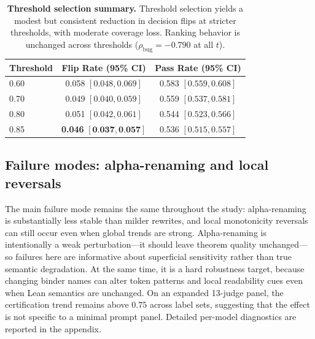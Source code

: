 \documentclass{article}
\begin{document}
\begin{table}[t]
  \centering
  \small
  \begin{tabular}{lcc}
    \toprule
    \textbf{Threshold} & \textbf{Flip Rate (95\% CI)}                        & \textbf{Pass Rate (95\% CI)} \\
    \midrule
    0.60               & 0.058 \([0.048, 0.069]\)                            & 0.583 \([0.559, 0.608]\)     \\
    0.70               & 0.049 \([0.040, 0.059]\)                            & 0.559 \([0.537, 0.581]\)     \\
    0.80               & 0.051 \([0.042, 0.061]\)                            & 0.544 \([0.523, 0.566]\)     \\
    0.85               & \textbf{0.046} \([\textbf{0.037}, \textbf{0.057}]\) & 0.536 \([0.515, 0.557]\)     \\
    \bottomrule
  \end{tabular}
  \caption{\textbf{Threshold selection summary.}
    Threshold selection yields a modest but consistent reduction in decision flips at stricter thresholds, with moderate coverage loss.
    Ranking behavior is unchanged across thresholds (\(\rho_{\text{bug}}=-0.790\) at all \(t\)).}
  \label{tab:exp13_threshold_sweep}
\end{table}

\subsection{Failure modes: alpha-renaming and local reversals}
The main failure mode remains the same throughout the study: alpha-renaming is substantially less stable than milder rewrites, and local monotonicity reversals can still occur even when global trends are strong. Alpha-renaming is intentionally a weak perturbation---it should leave theorem quality unchanged---so failures here are informative about superficial sensitivity rather than true semantic degradation. At the same time, it is a hard robustness target, because changing binder names can alter token patterns and local readability cues even when Lean semantics are unchanged. On an expanded 13-judge panel, the certification trend remains above \(0.75\) across label sets, suggesting that the effect is not specific to a minimal prompt panel. Detailed per-model diagnostics are reported in the appendix.
\end{document}
